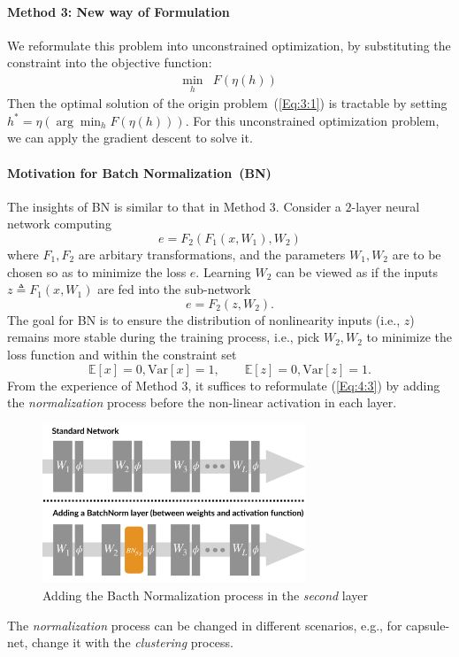 \begin{example}
\paragraph{Method 3: New way of Formulation}
We reformulate this problem into unconstrained optimization, by substituting the constraint into the objective function:
\begin{equation}\label{Eq:4:2}
\begin{array}{ll}
\min_h&F(\eta(h))
\end{array}
\end{equation}
Then the optimal solution of the origin problem~(\ref{Eq:3:1}) is tractable by setting $h^*=\eta(\arg\min_hF(\eta(h)))$.
For this unconstrained optimization problem, we can apply the gradient descent to solve it.
\end{example}

\paragraph{Motivation for Batch Normalization~(BN)}
The insights of BN is similar to that in Method 3. 
Consider a $2$-layer neural network computing
\begin{equation}\label{Eq:4:3}
e = F_2(F_1(x,W_1),W_2)
\end{equation}
where $F_1,F_2$ are arbitary transformations, and the parameters $W_1,W_2$ are to be chosen so as to minimize the loss $e$. 
Learning $W_2$ can be viewed as if the inputs $z\triangleq F_1(x,W_1)$ are fed into the sub-network
\[
e = F_2(z,W_2).
\]
The goal for BN is to ensure the distribution of nonlinearity inputs (i.e., $z$) remains more stable during the training process, i.e., pick $W_2,W_2$ to minimize the loss function and within the constraint set
\[
\mathbb{E}[x]=0,\text{Var}[x]=1,\qquad
\mathbb{E}[z]=0,\text{Var}[z]=1.
\]
From the experience of Method 3, it suffices to reformulate (\ref{Eq:4:3}) by adding the \emph{normalization} process before the non-linear activation in each layer.
\begin{figure}[H]
\centering
\includegraphics[width=0.7\textwidth]{Forth_lecture/f_4}
\caption{Adding the Bacth Normalization process in the \emph{second} layer}
\end{figure}
The \emph{normalization} process can be changed in different scenarios, e.g., for capsule-net, change it with the \emph{clustering} process.

